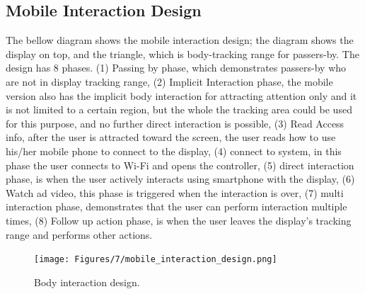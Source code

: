 \subsection{Mobile Interaction Design}
The bellow diagram shows the mobile interaction design; the diagram shows the display on top, and the triangle, which is body-tracking range for passers-by. The design has 8 phases. (1) Passing by phase, which demonstrates passers-by who are not in display tracking range, (2) Implicit Interaction phase, the mobile version also has the implicit body interaction for attracting attention only and it is not limited to a certain region, but the whole the tracking area could be used for this purpose, and no further direct interaction is possible, (3) Read Access info, after the user is attracted toward the screen, the user reads how to use his/her mobile phone to connect to the display, (4) connect to system, in this phase the user connects to Wi-Fi and opens the controller, (5) direct interaction phase, is when the user actively interacts using smartphone with the display, (6) Watch ad video, this phase is triggered when the interaction is over, (7) multi interaction phase, demonstrates that the user can perform interaction multiple times, (8) Follow up action phase, is when the user leaves the display’s tracking range and performs other actions.

\begin{figure}[H]
    \centering
    \texttt{[image: Figures/7/mobile\_interaction\_design.png]}
    \caption{Body interaction design.}%
    \label{fig:body_interaction_deisng}%
\end{figure}


